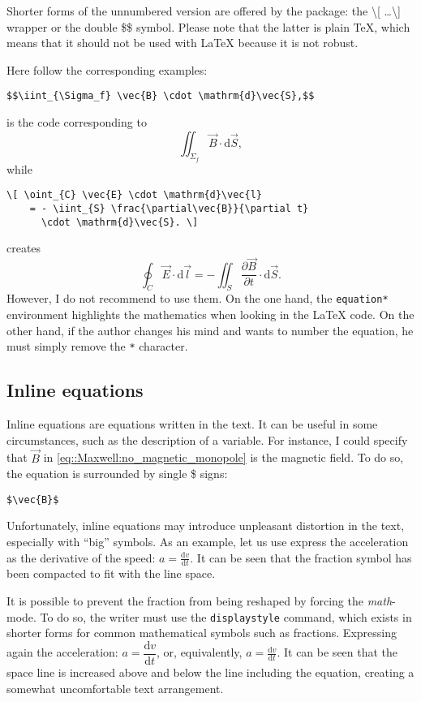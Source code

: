 		Shorter forms of the unnumbered version are offered by the package: the \textbackslash [ \ldots \textbackslash ] wrapper or the double \$\$ symbol.
		Please note that the latter is plain \TeX{}, which means that it should not be used with LaTeX because it is not robust.
		
		Here follow the corresponding examples:
\begin{lstlisting}[language={[LaTeX]TeX}]
$$\iint_{\Sigma_f} \vec{B} \cdot \mathrm{d}\vec{S},$$
\end{lstlisting}
		is the code corresponding to
		$$ \iint_{\Sigma_f} \vec{B} \cdot \mathrm{d}\vec{S}, $$
		while
\begin{lstlisting}[language={[LaTeX]TeX}]
\[ \oint_{C} \vec{E} \cdot \mathrm{d}\vec{l}
	= - \iint_{S} \frac{\partial\vec{B}}{\partial t}
	  \cdot \mathrm{d}\vec{S}. \]
\end{lstlisting}
		creates
		\[ \oint_{C} \vec{E} \cdot \mathrm{d}\vec{l}
			= - \iint_{S} \frac{\partial\vec{B}}{\partial t}
			  \cdot \mathrm{d}\vec{S}. \]
		However, I do not recommend to use them. 
		On the one hand, the \texttt{equation*} environment highlights the mathematics when looking in the \LaTeX{} code.
		On the other hand, if the author changes his mind and wants to number the equation, he must simply remove the \texttt{*} character.
	
	
	\subsection{Inline equations}
	
		Inline equations are equations written in the text.
		It can be useful in some circumstances, such as the description of a variable.
		For instance, I could specify that $\vec{B}$ in \cref{eq::Maxwell:no_magnetic_monopole} is the magnetic field.
		To do so, the equation is surrounded by single \$ signs:
\begin{lstlisting}[language={[LaTeX]TeX}]
$\vec{B}$
\end{lstlisting}
		
		Unfortunately, inline equations may introduce unpleasant distortion in the text, especially with \enquote{big} symbols.
		As an example, let us use express the acceleration as the derivative of the speed:
		$a=\frac{\mathrm{d}v}{\mathrm{d}t}$.
		It can be seen that the fraction symbol has been compacted to fit with the line space.
		
		It is possible to prevent the fraction from being reshaped by forcing the \textit{math}-mode.
		To do so, the writer must use the \texttt{displaystyle} command, which exists in shorter forms for common mathematical symbols such as fractions.
		Expressing again the acceleration:
		$a=\dfrac{\mathrm{d}v}{\mathrm{d}t}$, or, equivalently,
		$\displaystyle a=\frac{\mathrm{d}v}{\mathrm{d}t}$.
		It can be seen that the space line is increased above and below the line including the equation, creating a somewhat uncomfortable text arrangement.
		
